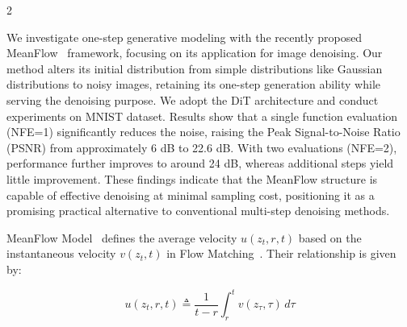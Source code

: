 \documentclass[a0,portrait]{a0poster}
\newcommand{\mysectionstar}[1]{%
  \vspace{1em} %
  \noindent
  \tikz[baseline]{%
    \node[
      fill=SteelBlue,           %
      text width=\linewidth, %
      align=center,        %
      inner sep=6pt        %
    ] {\color{white}\huge\textbf{#1}};  %
  }%
  \vspace{0.0em} %
}
\begin{document}

\begin{multicols}{2} %



\mysectionstar{Abstract}

We investigate one-step generative modeling with the recently proposed MeanFlow~\cite{geng2025mean} framework, focusing on its application for image denoising. Our method alters its initial distribution from simple distributions like Gaussian distributions to noisy images, retaining its one-step generation ability while serving the denoising purpose. We adopt the DiT architecture and conduct experiments on MNIST dataset. Results show that a single function evaluation (NFE=1) significantly reduces the noise, raising the Peak Signal-to-Noise Ratio (PSNR) from approximately 6 dB to 22.6 dB. With two evaluations (NFE=2), performance further improves to around 24 dB, whereas additional steps yield little improvement. These findings indicate that the MeanFlow structure is capable of effective denoising at minimal sampling cost, positioning it as a promising practical alternative to conventional multi-step denoising methods.


\mysectionstar{Methodology}

MeanFlow Model~\cite{geng2025mean} defines the average velocity $u(z_t, r, t)$ based on the instantaneous velocity $v(z_t, t)$ in Flow Matching~\cite{lipman2023flowmatchinggenerativemodeling}. Their relationship is given by:

\begin{equation}
  u(z_t, r, t) \triangleq \frac{1}{t-r} \int_r^t v(z_\tau, \tau) \, d \tau
\end{equation}


\end{multicols}
\end{document}
